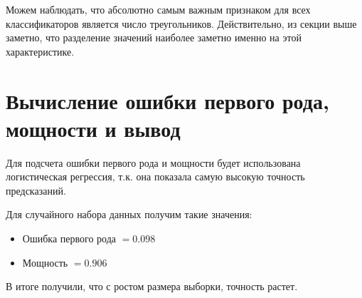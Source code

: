 \documentclass{report}
\begin{document}
Можем наблюдать, что абсолютно самым важным признаком для всех классификаторов является число треугольников. Действительно, из секции выше заметно, что разделение значений наиболее заметно именно на этой характеристике.

\section{Вычисление ошибки первого рода, мощности и вывод}

Для подсчета ошибки первого рода и мощности будет использована логистическая регрессия, т.к. она показала самую высокую точность предсказаний.

Для случайного набора данных получим такие значения:
\begin{itemize}
    \item Ошибка первого рода $= 0.098$
    \item Мощность $= 0.906$
\end{itemize}

В итоге получили, что с ростом размера выборки, точность растет.
\end{document}
